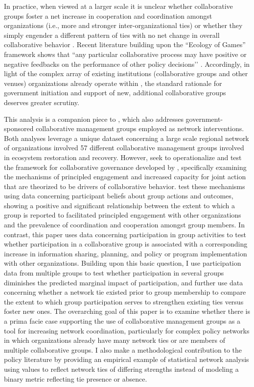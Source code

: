 \documentclass[12pt,a4paper,titlepage]{article}
\begin{document}
In practice, when viewed at a larger scale it is unclear whether collaborative groups foster a net increase in cooperation and coordination amongst organizations (i.e., more and stronger inter-organizational ties) or whether they simply engender a different pattern of ties with no net change in overall collaborative behavior \parencite{lubell2010,lubell2011}. Recent literature building upon the ``Ecology of Games'' framework \parencite{berardo2010,lubell2010,lubell2011, lubell2011-a, mcallister2014, smaldino2014, niles2012} shows that “any particular collaborative process may have positive or negative feedbacks on the performance of other policy decisions’’ \parencite[424]{gerlak2012}. Accordingly, in light of the complex array of existing institutions (collaborative groups and other venues) organizations already operate within \parencite[see][]{lubell2013, lubell2011-a}, the standard rationale for government initiation and support of new, additional collaborative groups deserves greater scrutiny.

This analysis is a companion piece to \textcite{scott2015-a}, which also addresses government-sponsored collaborative management groups employed as network interventions. Both analyses leverage a unique dataset concerning a large scale regional network of organizations involved 57 different collaborative management groups involved in ecosystem restoration and recovery. However, \textcite{scott2015-a} seek to operationalize and test the framework for collaborative governance developed by \textcite{emerson2012}, specifically examining the mechanisms of principled engagement and increased capacity for joint action that are theorized to be drivers of collaborative behavior. \textcite{scott2015-a} test these mechanisms using data concerning participant beliefs about group actions and outcomes, showing a positive and significant relationship between the extent to which a group is reported to facilitated principled engagement with other organizations and the prevalence of coordination and cooperation amongst group members. In contrast, this paper uses data concerning participation in group activities to test whether participation in a collaborative group is associated with a corresponding increase in information sharing, planning, and policy or program implementation with other organizations. Building upon this basic question, I use participation data from multiple groups to test whether participation in several groups diminishes the predicted marginal impact of participation, and further use data concerning whether a network tie existed prior to group membership to compare the extent to which group participation serves to strengthen existing ties versus foster new ones. The overarching goal of this paper is to examine whether there is a prima facie case supporting the use of collaborative management groups as a tool for increasing network coordination, particularly for complex policy networks in which organizations already have many network ties or are members of multiple collaborative groups. I also make a methodological contribution to the policy literature by providing an empirical example of statistical network analysis using values to reflect network ties of differing strengths instead of modeling a binary metric reflecting tie presence or absence.
\end{document}
